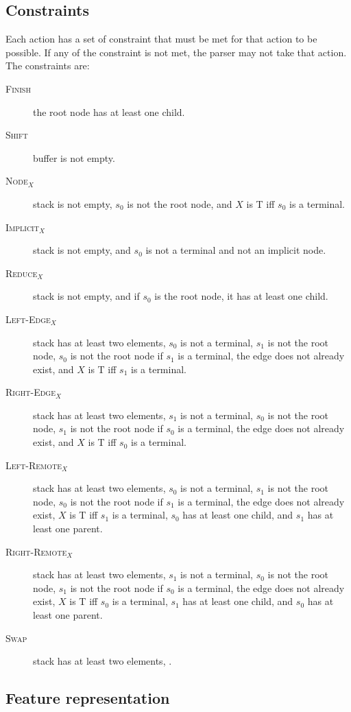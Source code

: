 \documentclass[11pt]{article}
\begin{document}
\subsection{Constraints}
Each action has a set of constraint that must be met for that action to be possible. If any of the constraint is not met, the parser may not take that action. The constraints are:
\begin{description}
	\item[\textsc{Finish}] the root node has at least one child.
	\item[\textsc{Shift}] buffer is not empty.
	\item[\textsc{Node$_X$}] stack is not empty, $s_0$ is not the root node, and $X$ is T iff $s_0$ is a terminal.
	\item[\textsc{Implicit$_X$}] stack is not empty, and $s_0$ is not a terminal and not an implicit node.
	\item[\textsc{Reduce$_X$}] stack is not empty, and if $s_0$ is the root node, it has at least one child.
	\item[\textsc{Left-Edge$_X$}] stack has at least two elements, $s_0$ is not a terminal, $s_1$ is not the root node, $s_0$ is not the root node if $s_1$ is a terminal, the edge does not already exist, and $X$ is T iff $s_1$ is a terminal.
	\item[\textsc{Right-Edge$_X$}] stack has at least two elements, $s_1$ is not a terminal, $s_0$ is not the root node, $s_1$ is not the root node if $s_0$ is a terminal, the edge does not already exist, and $X$ is T iff $s_0$ is a terminal.
	\item[\textsc{Left-Remote$_X$}] stack has at least two elements, $s_0$ is not a terminal, $s_1$ is not the root node, $s_0$ is not the root node if $s_1$ is a terminal, the edge does not already exist, $X$ is T iff $s_1$ is a terminal, $s_0$ has at least one child, and $s_1$ has at least one parent.
	\item[\textsc{Right-Remote$_X$}] stack has at least two elements, $s_1$ is not a terminal, $s_0$ is not the root node, $s_1$ is not the root node if $s_0$ is a terminal, the edge does not already exist, $X$ is T iff $s_0$ is a terminal, $s_1$ has at least one child, and $s_0$ has at least one parent.
	\item[\textsc{Swap}] stack has at least two elements, .
\end{description}

\subsection{Feature representation}
\label{subsec:features}
\end{document}
